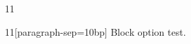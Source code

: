 \documentclass[paper=A4]{ropas-poster}
\begin{document}
\begin{postergrid}{1}{1}
\begin{posterblock}{1}{1}[paragraph-sep=10bp]
Block option test.
\end{posterblock}
\end{postergrid}
\end{document}
